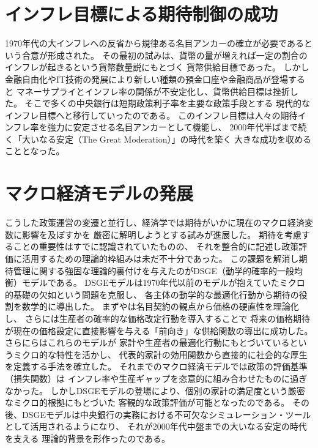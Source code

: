 \section{インフレ目標による期待制御の成功}
\label{sec:chapter2_review_success_of_inflation_targeting}
1970年代の大インフレへの反省から規律ある名目アンカーの確立が必要であるという合意が形成された。
その最初の試みは、貨幣の量が増えれば一定の割合のインフレが起きるという貨幣数量説にもとづく
貨幣供給目標であった。
しかし金融自由化やIT技術の発展により新しい種類の預金口座や金融商品が登場すると
マネーサプライとインフレ率の関係が不安定化し、貨幣供給目標は挫折した。
そこで多くの中央銀行は短期政策利子率を主要な政策手段とする
現代的なインフレ目標へと移行していったのである\parencite{Mishkin1999}。
このインフレ目標は人々の期待インフレ率を強力に安定させる名目アンカーとして機能し、
2000年代半ばまで続く「大いなる安定（The Great Moderation）」\parencite{Bernanke2004}の時代を築く
大きな成功を収めることとなった。

\section{マクロ経済モデルの発展}
\label{sec:chapter2_review_macro_model_development}
こうした政策運営の変遷と並行し、経済学では期待がいかに現在のマクロ経済変数に影響を及ぼすかを
厳密に解明しようとする試みが進展した。
期待を考慮することの重要性はすでに認識されていたものの、
それを整合的に記述し政策評価に活用するための理論的枠組みは未だ不十分であった。
この課題を解消し期待管理に関する強固な理論的裏付けを与えたのがDSGE（動学的確率的一般均衡）モデルである。
DSGEモデルは1970年代以前のモデルが抱えていたミクロ的基礎の欠如という問題を克服し、
各主体の動学的な最適化行動から期待の役割を数学的に導出した。
まず\textcite{Fischer1977}や\textcite{Taylor1980}は名目契約の観点から価格の硬直性を理論化し、
さらに\textcite{Calvo1983}は生産者の確率的な価格改定行動を導入することで
将来の価格期待が現在の価格設定に直接影響を与える「前向き」な供給関数の導出に成功した。
さらに\textcite{Woodford2003}らはこれらのモデルが
家計や生産者の最適化行動にもとづいているというミクロ的な特性を活かし、
代表的家計の効用関数から直接的に社会的な厚生を定義する手法を確立した。
それまでのマクロ経済モデルでは政策の評価基準（損失関数）は
インフレ率や生産ギャップを恣意的に組み合わせたものに過ぎなかった。
しかしDSGEモデルの登場により、個別の家計の満足度という厳密なミクロ的根拠にもとづいた
客観的な政策評価が可能となったのである。
その後、DSGEモデルは中央銀行の実務における不可欠なシミュレーション・ツールとして活用されるようになり、
それが2000年代中盤までの大いなる安定の時代を支える
理論的背景を形作ったのである。

